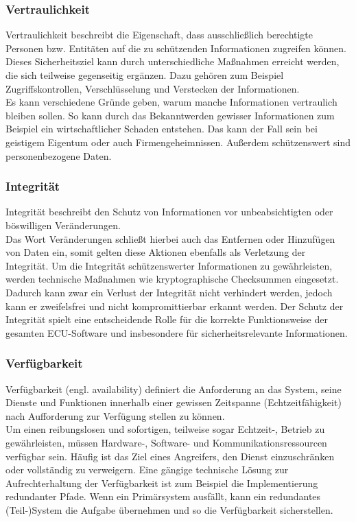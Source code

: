\subsubsection{Vertraulichkeit}
\glqq  Vertraulichkeit beschreibt die Eigenschaft, dass ausschließlich berechtigte Personen bzw. Entitäten auf die zu schützenden Informationen zugreifen können.
\grqq{} \cite[7]{Wurm.2022}\\
Dieses Sicherheitsziel kann durch unterschiedliche Maßnahmen erreicht werden, die sich teilweise gegenseitig ergänzen. Dazu gehören zum Beispiel Zugriffskontrollen, Verschlüsselung und Verstecken der Informationen.\\
Es kann verschiedene Gründe geben, warum manche Informationen vertraulich bleiben sollen. So kann durch das Bekanntwerden gewisser Informationen zum Beispiel ein wirtschaftlicher Schaden entstehen. Das kann der Fall sein bei geistigem Eigentum oder auch Firmengeheimnissen. Außerdem schützenswert sind personenbezogene Daten.

\subsubsection{Integrität}
\glqq Integrität beschreibt den Schutz von Informationen vor unbeabsichtigten oder böswilligen Veränderungen.
\grqq{} \cite[7]{Wurm.2022} \\
Das Wort Veränderungen schließt hierbei auch das Entfernen oder Hinzufügen von Daten ein, somit gelten diese Aktionen ebenfalls als Verletzung der Integrität.
Um die Integrität schützenswerter Informationen zu gewährleisten, werden technische Maßnahmen wie kryptographische Checksummen eingesetzt. Dadurch kann zwar ein Verlust der Integrität nicht verhindert werden, jedoch kann er zweifelsfrei und nicht kompromittierbar erkannt werden. Der Schutz der Integrität spielt eine entscheidende Rolle für die korrekte Funktionsweise der gesamten ECU-Software und insbesondere für sicherheitsrelevante Informationen.

\subsubsection{Verfügbarkeit}
\glqq Verfügbarkeit (engl. availability) definiert die Anforderung an das System, seine Dienste und Funktionen innerhalb einer gewissen Zeitspanne (Echtzeitfähigkeit) nach Aufforderung zur Verfügung stellen zu können.
\grqq{} \cite[7]{Wurm.2022} \\
Um einen reibungslosen und sofortigen, teilweise sogar Echtzeit-, Betrieb zu gewährleisten, müssen Hardware-, Software- und Kommunikationsressourcen verfügbar sein. Häufig ist das Ziel eines Angreifers, den Dienst einzuschränken oder vollständig zu verweigern. Eine gängige technische Lösung zur Aufrechterhaltung der Verfügbarkeit ist zum Beispiel die Implementierung redundanter Pfade. Wenn ein Primärsystem ausfällt, kann ein redundantes (Teil-)System die Aufgabe übernehmen und so die Verfügbarkeit sicherstellen.

